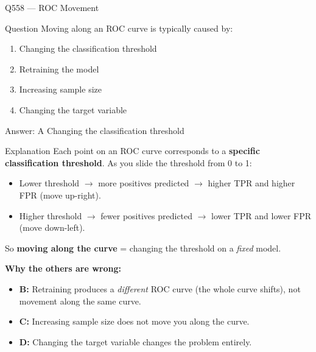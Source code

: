 \documentclass[aspectratio=169,8pt]{beamer}
\begin{document}
	\begin{frame}{Q558 --- ROC Movement}
		\begin{block}{Question}
			Moving along an ROC curve is typically caused by:
			\begin{enumerate}
				\item Changing the classification threshold
				\item Retraining the model
				\item Increasing sample size
				\item Changing the target variable
			\end{enumerate}
		\end{block}
		
		\begin{exampleblock}{Answer: A}
			Changing the classification threshold
		\end{exampleblock}
		
		\begin{block}{Explanation}
			Each point on an ROC curve corresponds to a \textbf{specific classification
				threshold}. As you slide the threshold from 0 to 1:
			\begin{itemize}
				\item Lower threshold \(\rightarrow\) more positives predicted
				\(\rightarrow\) higher TPR and higher FPR (move up-right).
				\item Higher threshold \(\rightarrow\) fewer positives predicted
				\(\rightarrow\) lower TPR and lower FPR (move down-left).
			\end{itemize}
			
			So \textbf{moving along the curve} = changing the threshold on a
			\emph{fixed} model.
			
			\textbf{Why the others are wrong:}
			\begin{itemize}
				\item \textbf{B:} Retraining produces a \emph{different} ROC curve (the
				whole curve shifts), not movement along the same curve.
				\item \textbf{C:} Increasing sample size does not move you along the curve.
				\item \textbf{D:} Changing the target variable changes the problem entirely.
			\end{itemize}
		\end{block}
	\end{frame}
	
\end{document}
